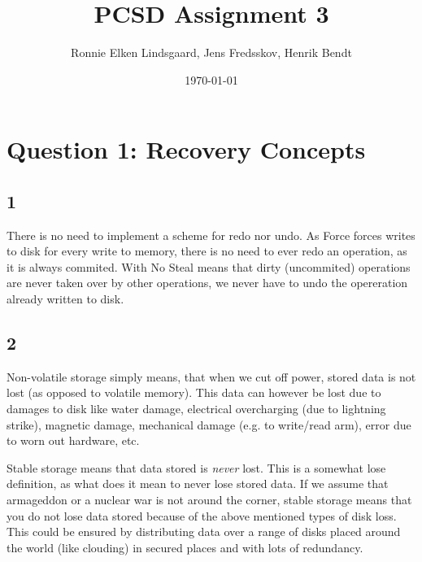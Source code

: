 \documentclass[a4paper, 10pt]{article}
\author{Ronnie Elken Lindsgaard, Jens Fredsskov, Henrik Bendt\vspace{0.5em}}
\title{PCSD Assignment 3}
\date{\today}
\begin{document}
\maketitle
\pagebreak

\section*{Question 1: Recovery Concepts}
\subsection*{1}
There is no need to implement a scheme for redo nor undo. As Force forces writes to disk for every write to memory, there is no need to ever redo an operation, as it is always commited. With No Steal means that dirty (uncommited) operations are never taken over by other operations, we never have to undo the opereration already written to disk.

\subsection*{2}
Non-volatile storage simply means, that when we cut off power, stored data is not lost (as opposed to volatile memory). This data can however be lost due to damages to disk like water damage, electrical overcharging (due to lightning strike), magnetic damage, mechanical damage (e.g. to write/read arm), error due to worn out hardware, etc.

Stable storage means that data stored is \textit{never} lost. This is a somewhat lose definition, as what does it mean to never lose stored data. If we assume that armageddon or a nuclear war is not around the corner, stable storage means that you do not lose data stored because of the above mentioned types of disk loss. This could be ensured by distributing data over a range of disks placed around the world (like clouding) in secured places and with lots of redundancy.
\end{document}
